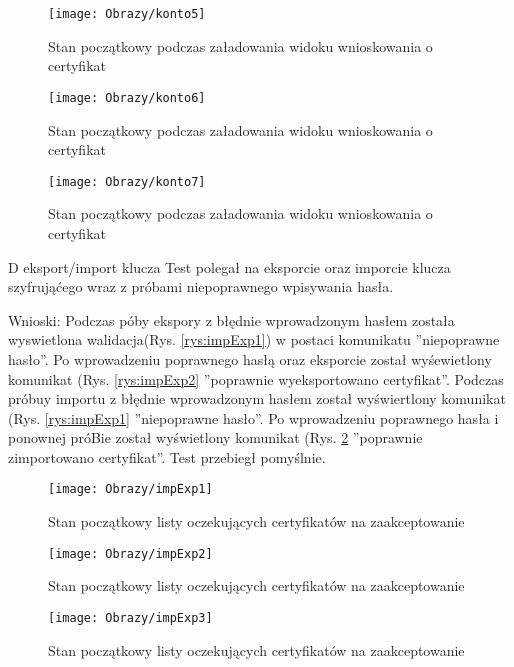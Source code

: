 \begin{enumerate*}
\begin{figure}[ht!]
			
			\begin{minipage}{0.2\textwidth}
				\texttt{[image: Obrazy/konto5]}
				\caption{Stan początkowy podczas załadowania widoku wnioskowania o certyfikat}
				\label{rys:zarzadzanieKontem5}
			\end{minipage}
		
		
			\begin{minipage}{0.2\textwidth}
			\texttt{[image: Obrazy/konto6]}
			\caption{Stan początkowy podczas załadowania widoku wnioskowania o certyfikat}
			\label{rys:zarzadzanieKontem6}
		\end{minipage}
	
		\begin{minipage}{0.2\textwidth}
		\texttt{[image: Obrazy/konto7]}
		\caption{Stan początkowy podczas załadowania widoku wnioskowania o certyfikat}
		\label{rys:zarzadzanieKontem7}
	\end{minipage}

			
		\end{figure}
		
	\item  D eksport/import klucza
	Test polegał na eksporcie oraz imporcie klucza szyfrująćego wraz z próbami niepoprawnego wpisywania hasła.
	
	Wnioski: Podczas póby ekspory z błędnie wprowadzonym hasłem została wyswietlona walidacja(Rys. \ref{rys:impExp1}) w postaci komunikatu ''niepoprawne hasło''. Po wprowadzeniu poprawnego hasłą oraz eksporcie został wyśewietlony komunikat (Rys. \ref{rys:impExp2} ''poprawnie wyeksportowano certyfikat''. Podczas próbuy importu z błędnie wprowadzonym hasłem został wyświertlony komunikat (Rys. \ref{rys:impExp1} ''niepoprawne hasło''. Po wprowadzeniu poprawnego hasła i ponownej próBie został wyświetlony komunikat (Rys. \ref{rys:impExp3} ''poprawnie zimportowano certyfikat''. Test przebiegł pomyślnie.
	
	
	
	\begin{figure}[ht!]
		\begin{minipage}{0.2\textwidth}
			\texttt{[image: Obrazy/impExp1]}
			\caption{Stan początkowy listy oczekujących certyfikatów na zaakceptowanie }
			\label{rys:impExp1}
		\end{minipage}
		\begin{minipage}{0.2\textwidth}
			\texttt{[image: Obrazy/impExp2]}
			\caption{Stan początkowy listy oczekujących certyfikatów na zaakceptowanie }
			\label{rys:impExp2}
		\end{minipage}
		
		\begin{minipage}{0.2\textwidth}
			\texttt{[image: Obrazy/impExp3]}
			\caption{Stan początkowy listy oczekujących certyfikatów na zaakceptowanie }
			\label{rys:impExp3}
		\end{minipage}
		
		
		
		
	\end{figure}
	
\end{enumerate*}
